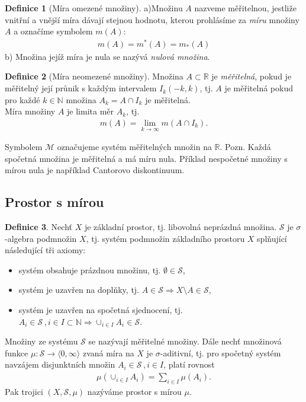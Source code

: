 \documentclass[a4]{report}
\theoremstyle{definition}
\newtheorem{definition}{Definice}[section]
\begin{document}
{\begin{definition}[Míra omezené množiny]
a)Množinu $A$ nazveme měřitelnou, jestliže vnitřní a vnější míra dávají stejnou hodnotu, kterou prohlásíme za \textit{míru} množiny $A$ a označíme symbolem $m(A)$:
\begin{align*}
m(A)=m^*(A)=m_*(A)
\end{align*}
b) Množina jejíž míra je nula se nazývá \textit{nulová množina}.
\end{definition}
\begin{definition}[Míra neomezené množiny]
Množina $A\subset\mathbb{R}$ je \textit{měřitelná}, pokud je měřitelný její průnik s každým intervalem $I_k(-k,k)$, tj. $A$ je měřitelná pokud pro každé $k\in\mathbb{N}$ množina $A_k=A\cap I_k$ je měřitelná.
\\Míra množiny $A$ je limita měr $A_k$, tj. 
\begin{align*}
m(A)=\lim_{k\rightarrow\infty}m(A\cap I_k).
\end{align*}
\end{definition}
Symbolem $\mathscr{M}$ označujeme systém měřitelných množin na $\mathbb{R}$.
Pozn. Každá spočetná množina je měřitelná a má míru nula. Příklad nespočetné množiny s mírou nula je například Cantorovo diskontinuum.
\subsection{Prostor s mírou} 
\begin{definition}
Nechť $X$ je základní prostor, tj. libovolná neprázdná množina. $\mathscr{S}$ je $\sigma$-algebra podmnožin $X$, tj. systém podmnožin základního prostoru $X$
splňující následující tři axiomy:
\begin{itemize}
\item systém obsahuje prázdnou množinu, tj. $\emptyset\in\mathscr{S}$,
\item systém je uzavřen na doplňky, tj. $A \in\mathscr{S}\Rightarrow X\setminus A\in\mathscr{S}$,
\item systém je uzavřen na spočetná sjednocení, tj. $A_i\in \mathscr{S}\,,i\in I\subset\mathbb{N}\Rightarrow \cup_{i\in I} A_i \in \mathscr{S}$.
\end{itemize}
Množiny ze systému $\mathscr{S}$ se nazývají měřitelné množiny. Dále nechť množinová funkce $\mu:\mathscr{S}\rightarrow \langle 0,\infty\rangle$ zvaná míra na $X$ je $\sigma$-aditivní, tj. pro spočetný
systém navzájem disjunktních množin $A_i \in \mathscr{S}\,,i\in I$, platí rovnost 
\begin{align*}
\mu(\cup_{i\in I} A_i)=\sum_{i\in I} \mu(A_i).
\end{align*}
Pak trojici $(X, \mathscr{S}, \mu)$ nazýváme prostor s mírou $\mu$.
\end{definition}

}
\end{document}
